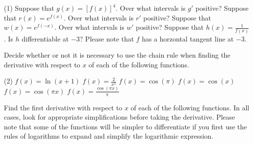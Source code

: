\documentclass[10pt,oneside,]{book}
\theoremstyle{plain}
\theoremstyle{definition}
\numberwithin{equation}{section}
\newcommand{\fe}[2]{#1\mathopen{}\left(#2\right)\mathclose{}}
\newcommand{\fd}[1]{#1'}
\begin{document}
\par
\begin{exercisegroup}(1)
\exercise[6.]\hypertarget{exercise-487}{\null}Suppose that \(\fe{g}{x}=\left[\fe{f}{x}\right]^4\). Over what intervals is \(\fd{g}\) positive?%
\exercise[7.]\hypertarget{exercise-488}{\null}Suppose that \(\fe{r}{x}=e^{\fe{f}{x}}\). Over what intervals is \(\fd{r}\) positive?%
\exercise[8.]\hypertarget{exercise-489}{\null}Suppose that \(\fe{w}{x}=e^{\fe{f}{-x}}\). Over what intervals is \(\fd{w}\) positive?%
\exercise[9.]\hypertarget{exercise-490}{\null}Suppose that \(\fe{h}{x}=\frac{1}{\fe{f}{x}}\). Is \(h\) differentiable at \(-3\)? Please note that \(f\) has a horzontal tangent line at \(-3\).%
\end{exercisegroup}
\par\smallskip\noindent
Decide whether or not it is necessary to use the chain rule when finding the derivative with respect to \(x\) of each of the following functions.%
\par
\begin{exercisegroup}(2)
\exercise[10.]\hypertarget{exercise-491}{\null}\(\fe{f}{x}=\fe{\ln}{x+1}\)%
\exercise[11.]\hypertarget{exercise-492}{\null}\(\fe{f}{x}=\frac{2}{x^5}\)%
\exercise[12.]\hypertarget{exercise-493}{\null}\(\fe{f}{x}=\fe{\cos}{\pi}\)%
\exercise[13.]\hypertarget{exercise-494}{\null}\(\fe{f}{x}=\fe{\cos}{x}\)%
\exercise[14.]\hypertarget{exercise-495}{\null}\(\fe{f}{x}=\fe{\cos}{\pi x}\)%
\exercise[15.]\hypertarget{exercise-496}{\null}\(\fe{f}{x}=\frac{\fe{\cos}{\pi x}}{\pi}\)%
\end{exercisegroup}
\par\smallskip\noindent
Find the first derivative with respect to \(x\) of each of the following functions.  In all cases, look for appropriate simplifications before taking the derivative.  Please note that some of the functions will be simpler to differentiate if you first use the rules of logarithms to expand and simplify the logarithmic expression.%
\par
\end{document}
